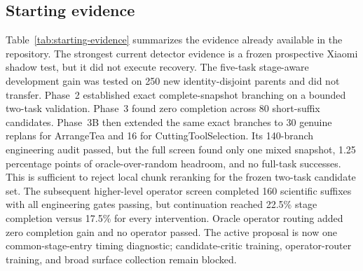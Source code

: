 \subsection{Starting evidence}

Table~\ref{tab:starting-evidence} summarizes the evidence already available in the repository. The strongest current detector evidence is a frozen prospective Xiaomi shadow test, but it did not execute recovery. The five-task stage-aware development gain was tested on 250 new identity-disjoint parents and did not transfer. Phase~2 established exact complete-snapshot branching on a bounded two-task validation. Phase~3 found zero completion across 80 short-suffix candidates. Phase~3B then extended the same exact branches to 30 genuine replans for ArrangeTea and 16 for CuttingToolSelection. Its 140-branch engineering audit passed, but the full screen found only one mixed snapshot, 1.25 percentage points of oracle-over-random headroom, and no full-task successes. This is sufficient to reject local chunk reranking for the frozen two-task candidate set. The subsequent higher-level operator screen completed 160 scientific suffixes with all engineering gates passing, but continuation reached 22.5\% stage completion versus 17.5\% for every intervention. Oracle operator routing added zero completion gain and no operator passed. The active proposal is now one common-stage-entry timing diagnostic; candidate-critic training, operator-router training, and broad surface collection remain blocked.


